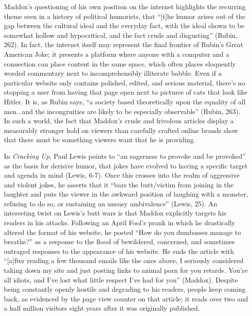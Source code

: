 Maddox's questioning of his own position on the internet highlights the
recurring theme seen in a history of political humorists, that ``[t]he humor
arises out of the gap between the cultural ideal and the everyday fact, with the
ideal shown to be somewhat hollow and hypocritical, and the fact crude and
disgusting'' (Rubin, 262). In fact, the internet itself may represent the final
frontier of Rubin's Great American Joke; it presents a platform where anyone
with a computer and a connection can place content in the same space, which
often places eloquently worded commentary next to incomprehensibly illiterate
babble. Even if a particular website only contains polished, edited, and serious
material, there's no stopping a user from having that page open next to pictures
of cats that look like Hitler. It is, as Rubin says, ``a society based
theoretically upon the equality of all men...and the incongruities are likely to
be especially observable'' (Rubin, 263). In such a world, the fact that Maddox's
crude and frivolous articles display a measurably stronger hold on viewers than
carefully crafted online brands show that there must be something viewers want
that he is providing.

In \textit{Cracking Up}, Paul Lewis points to ``an eagerness to provoke and be
provoked'' as the basis for derisive humor, that jokes have evolved to having a
specific target and agenda in mind (Lewis, 6-7). Once this crosses into the
realm of aggressive and violent jokes, he asserts that it ``bars the butt/victim
from joining in the laughter and puts the viewer in the awkward  position of
laughing with a monster, refusing to do so, or sustaining an uneasy
ambivalence'' (Lewis, 25). An interesting twist on Lewis's butt wars is that
Maddox explicitly targets his readers in his attacks. Following an April Fool's
prank in which he drastically altered the format of his website, he posted ``How
do you dumbasses  manage to breathe?'' as a response to the flood of bewildered,
concerned, and sometimes outraged responses to the appearance of his website. He
ends the article with ``[a]fter reading a few thousand emails like the ones
above, I seriously considered taking down my site and just posting links to
animal porn for you retards. You're all idiots, and I've lost what little
respect I've had for you'' (Maddox). Despite being constantly openly hostile and
degrading to his readers, people keep coming back, as evidenced by the page view
counter on that article; it reads over two and a half million visitors eight
years after it was originally published.

